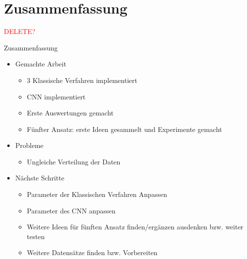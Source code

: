 \documentclass[aspectratio=169]{beamer} %
\begin{document}
\section{Zusammenfassung}
\begin{frame}
    \textcolor{red}{DELETE?}
    \begin{block}{Zusammenfassung}
        \begin{itemize}
            \item Gemachte Arbeit
                  \begin{itemize}
                      \item 3 Klassische Verfahren implementiert
                      \item CNN implementiert
                      \item Erste Auswertungen gemacht
                      \item F\"unfter Ansatz: erste Ideen gesammelt und Experimente gemacht
                  \end{itemize}
            \item Probleme
                  \begin{itemize}
                      \item Ungleiche Verteilung der Daten
                  \end{itemize}
            \item N\"achste Schritte
                  \begin{itemize}
                      \item Parameter der Klassischen Verfahren Anpassen
                      \item Parameter des CNN anpassen
                      \item Weitere Ideen f\"ur f\"unften Ansatz finden/erg\"anzen
                            ausdenken bzw. weiter testen
                      \item Weitere Datens\"atze finden bzw. Vorbereiten
                  \end{itemize}
        \end{itemize}
    \end{block}
\end{frame}
\end{document}
